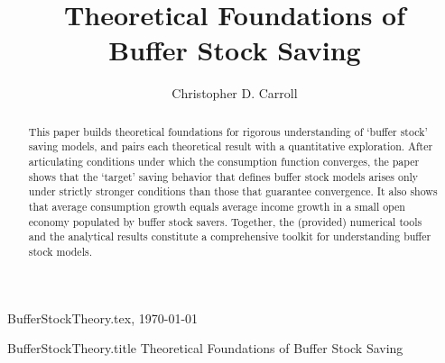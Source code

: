 \documentclass[titlepage]{\econtex}\providecommand{\texname}{BufferStockTheory}
\providecommand{\onlyinsubfile}{}
\providecommand{\notinsubfile}{}
\renewcommand{\onlyinsubfile}[1]{}
\renewcommand{\notinsubfile}[1]{#1}
\begin{document}

\renewcommand{\onlyinsubfile}[1]{}\renewcommand{\notinsubfile}[1]{#1} 

\hfill{\tiny \texname.tex, \today}

\begin{verbatimwrite}{\texname.title}
Theoretical Foundations of Buffer Stock Saving
\end{verbatimwrite}


\title{Theoretical Foundations of \\ Buffer Stock Saving}

\author{Christopher D. Carroll\authNum}




\maketitle 


\hypertarget{abstract}{}
\begin{abstract}
  This paper builds theoretical foundations for rigorous understanding of `buffer stock' saving models, and pairs each theoretical result with a quantitative exploration.  After articulating conditions under which the consumption function converges, the paper shows that the `target' saving behavior that defines buffer stock models arises only under strictly stronger conditions than those that guarantee convergence.  It also shows that average consumption growth equals average income growth in a small open economy populated by buffer stock savers.  Together, the (provided) numerical tools and the analytical results constitute a comprehensive toolkit for understanding buffer stock models.
\end{abstract}
\end{document}

